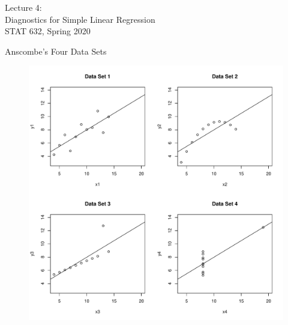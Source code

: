 \documentclass[10pt]{beamer}
\begin{document}
\begin{frame}
\large
Lecture 4:\\ 
Diagnostics for Simple Linear Regression\\
STAT 632, Spring 2020
\end{frame}

\begin{frame}{Anscombe's Four Data Sets}
\begin{figure}
\includegraphics[scale=0.4]{figure/anscombe.pdf}
\end{figure}
\end{frame}
\end{document}
